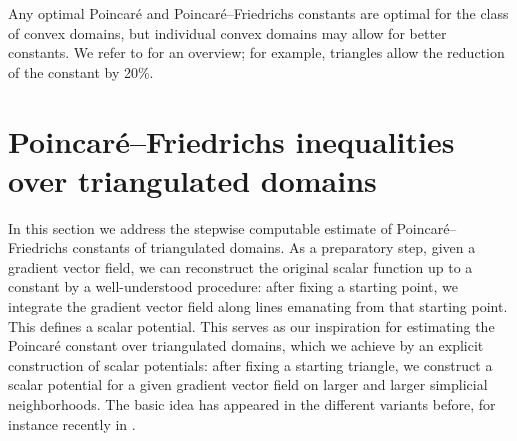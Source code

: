 \documentclass[10pt,letterpaper]{article}
\newcommand{\notice}[1]{\textcolor{red}{REMARK: #1}}
\begin{document}
\begin{remark}
\end{remark}


\begin{remark}
    Any optimal Poincar\'e and Poincar\'e--Friedrichs constants are optimal for the class of convex domains, 
    but individual convex domains may allow for better constants.
    We refer to \cite{matculevich2016explicit} for an overview;
    for example, triangles allow the reduction of the constant by 20\%.
\end{remark}









\section{Poincar\'e--Friedrichs inequalities over triangulated domains}\label{section:gradient}

In this section we address the stepwise computable estimate of Poincar\'e--Friedrichs constants of triangulated domains. 
As a preparatory step, given a gradient vector field, we can reconstruct the original scalar function up to a constant by a well-understood procedure: after fixing a starting point, we integrate the gradient vector field along lines emanating from that starting point. This defines a scalar potential. 
This serves as our inspiration for estimating the Poincar\'e constant over triangulated domains, which we achieve by an explicit construction of scalar potentials: 
after fixing a starting triangle, we construct a scalar potential for a given gradient vector field on larger and larger simplicial neighborhoods. 
The basic idea has appeared in the different variants before, for instance recently in \cite{Ern_Voh_p_rob_3D_20, Chaum_Voh_p_rob_3D_H_curl_23, Voh_loc_glob_H1_24}.
\\
\end{document}
